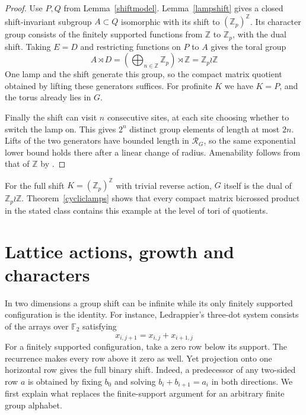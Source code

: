 \documentclass[11pt,a4paper]{article}
\theoremstyle{remark}
\begin{document}
\begin{proof}
Use $P,Q$ from Lemma~\ref{shiftmodel}. Lemma~\ref{lampshift} gives a
closed shift-invariant subgroup $A\subset Q$ isomorphic with its
shift to $(\mathbb Z_p)^{\mathbb Z}$. Its character group consists of the finitely supported functions
from $\mathbb Z$ to $\mathbb Z_p$, with the dual shift. Taking $E=D$ and restricting functions on $P$ to $A$ gives the toral group
\[
 \widehat A\rtimes D=\left(\bigoplus_{n\in\mathbb Z}\mathbb Z_p\right)\rtimes\mathbb Z
                       =\mathbb Z_p\wr\mathbb Z
\]
One lamp and the shift generate this group, so the compact matrix
quotient obtained by lifting these generators suffices. For profinite $K$ we
have $K=P$, and the torus already lies in $G$.

Finally the shift can visit $n$ consecutive sites, at each site choosing
whether to switch the lamp on. This gives $2^n$ distinct group elements
of length at most $2n$. Lifts of the two generators have bounded length
in $\mathcal R_G$, so the same exponential lower bound holds
there after a linear change of radius. Amenability follows from that of
$\mathbb Z$ by \cite[Corollary~3.7]{fmp}.
\end{proof}

For the full shift $K=(\mathbb Z_p)^{\mathbb Z}$ with trivial reverse action, $G$
itself is the dual of $\mathbb Z_p\wr\mathbb Z$. Theorem~\ref{cycliclamps} shows
that every compact matrix bicrossed product in the stated class contains
this example at the level of tori of quotients.

\section{Lattice actions, growth and characters}\label{seclattice}

In two dimensions a group shift can be infinite while its only finitely
supported configuration is the identity. For instance, Ledrappier's
three-dot system \cite{ledrappier} consists of the arrays over $\mathbb F_2$
satisfying
\[
 x_{i,j+1}=x_{i,j}+x_{i+1,j}
\]
For a finitely supported configuration, take a zero row below its
support. The recurrence makes every row above it zero as well. Yet
projection onto one horizontal row gives the full binary shift. Indeed,
a predecessor of any two-sided row $a$ is obtained by fixing $b_0$ and
solving $b_i+b_{i+1}=a_i$ in both directions. We first explain what replaces the finite-support
argument for an arbitrary finite group alphabet.
\end{document}
